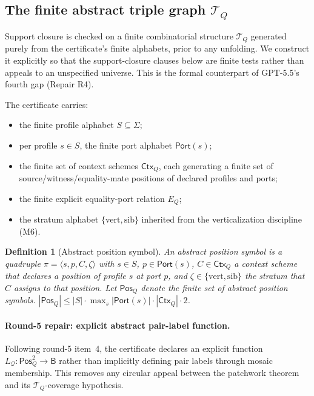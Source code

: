 \documentclass[11pt]{article}
\newtheorem{definition}[theorem]{Definition}
\newcommand{\Base}{\mathsf{B}}
\newcommand{\Q}{\mathcal Q}
\newcommand{\Ctx}{\mathsf{Ctx}}
\newcommand{\Port}{\mathsf{Port}}
\newcommand{\vertical}{\mathrm{vert}}
\newcommand{\sibling}{\mathrm{sib}}
\newcommand{\Pos}{\mathsf{Pos}}
\newcommand{\T}{\mathcal T}
\begin{document}
\subsection{The finite abstract triple graph $\mathcal T_Q$}
\label{ssec:abstract-triples}

Support closure is checked on a finite combinatorial structure
$\mathcal T_Q$ generated purely from the certificate's finite
alphabets, prior to any unfolding.  We construct it explicitly so
that the support-closure clauses below are finite tests rather than
appeals to an unspecified universe.  This is the formal counterpart
of GPT-5.5's fourth gap (Repair R4).

The certificate carries:
\begin{itemize}
\item the finite profile alphabet $S\subseteq\Sigma$;
\item per profile $s\in S$, the finite port alphabet $\Port(s)$;
\item the finite set of context schemes $\Ctx_Q$, each generating a
finite set of source/witness/equality-mate positions of declared
profiles and ports;
\item the finite explicit equality-port relation $E_Q$;
\item the stratum alphabet $\{\vertical,\sibling\}$ inherited from
the verticalization discipline (M6).
\end{itemize}

\begin{definition}[Abstract position symbol]\label{def:abs-pos}
An abstract position symbol is a quadruple
$\pi=\langle s,p,C,\zeta\rangle$ with $s\in S$, $p\in\Port(s)$,
$C\in\Ctx_Q$ a context scheme that declares a position of profile
$s$ at port $p$, and $\zeta\in\{\vertical,\sibling\}$ the stratum
that $C$ assigns to that position.  Let $\Pos_Q$ denote the finite
set of abstract position symbols.  $|\Pos_Q|\le|S|\cdot
\max_s|\Port(s)|\cdot|\Ctx_Q|\cdot 2$.
\end{definition}

\paragraph{Round-5 repair: explicit abstract pair-label function.}
Following round-5 item~4, the certificate declares an explicit
function $L_\Q:\Pos_Q^2\to\Base$ rather than implicitly defining
pair labels through mosaic membership.  This removes any circular
appeal between the patchwork theorem and its $\T_Q$-coverage
hypothesis.
\end{document}
